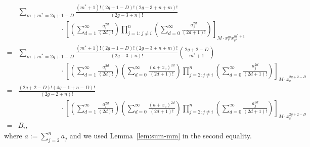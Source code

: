 \documentclass[12pt,reqno]{amsart}
\theoremstyle{plain}
\theoremstyle{definition}
\theoremstyle{remark}
\begin{document}
\begin{align*}
  &\sum_{m + m^* = 2g + 1 - D}\frac{(m^* + 1)!(2g + 1 - D)!(2g - 3 + n + m)!}{(2g - 3 + n)!} \\
  & \qquad \qquad \qquad \cdot \left[\left(\sum_{d = 1}^\infty \frac{a_i^{2d}}{(2d)!}\right) \prod_{j=1: j\neq i}^n \left(\sum_{d = 0}^\infty \frac{a_j^{2d}}{(2d + 1)!}\right)\right]_{M \cdot x_v^m x_{v^*}^{m^* + 1}} \\
  = &\sum_{m + m^* = 2g + 1 - D}\frac{(m^* + 1)!(2g + 1 - D)!(2g - 3 + n + m)!}{(2g - 3 + n)!} \binom{2g + 2 - D}{m^* + 1} \\
  & \qquad \qquad \qquad \cdot \left[\left(\sum_{d = 1}^\infty \frac{a_i^{2d}}{(2d)!}\right) \left(\sum_{d = 0}^\infty \frac{(a + x_v)^{2d}}{(2d + 1)!}\right) \prod_{j=2: j\neq i}^n \left(\sum_{d = 0}^\infty \frac{a_j^{2d}}{(2d + 1)!}\right)\right]_{M \cdot x_v^{2g + 2 - D}} \\
  = &\frac{(2g + 2 - D)!(4g - 1 + n - D)!}{(2g - 2 + n)!} \\
  & \qquad \qquad \qquad \cdot \left[\left(\sum_{d = 1}^\infty \frac{a_i^{2d}}{(2d)!}\right) \left(\sum_{d = 0}^\infty \frac{(a + x_v)^{2d}}{(2d + 1)!}\right) \prod_{j=2: j\neq i}^n \left(\sum_{d = 0}^\infty \frac{a_j^{2d}}{(2d + 1)!}\right)\right]_{M \cdot x_v^{2g + 2 - D}} \\
  = & B_i,
\end{align*}
where $a:=\sum_{j=2}^{n}a_j$ and we used Lemma~\ref{lem:sum-mm}  in the second equality.
\end{document}
